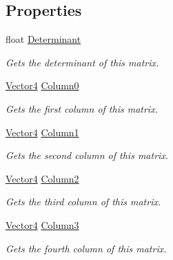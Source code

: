 \subsection*{Properties}
\begin{DoxyCompactItemize}
\item 
float \hyperlink{struct_open_t_k_1_1_matrix4_a2763231a75e342ff722346ac609ac5f7}{Determinant}
\begin{DoxyCompactList}\small\item\em Gets the determinant of this matrix. \end{DoxyCompactList}\item 
\hyperlink{struct_open_t_k_1_1_vector4}{Vector4} \hyperlink{struct_open_t_k_1_1_matrix4_a98cd484a752138482978b3695af0ea97}{Column0}
\begin{DoxyCompactList}\small\item\em Gets the first column of this matrix. \end{DoxyCompactList}\item 
\hyperlink{struct_open_t_k_1_1_vector4}{Vector4} \hyperlink{struct_open_t_k_1_1_matrix4_aa71936442a2e4d016158f6562457f8aa}{Column1}
\begin{DoxyCompactList}\small\item\em Gets the second column of this matrix. \end{DoxyCompactList}\item 
\hyperlink{struct_open_t_k_1_1_vector4}{Vector4} \hyperlink{struct_open_t_k_1_1_matrix4_a8ceb934eacdadb27bc25e1dad87aa19d}{Column2}
\begin{DoxyCompactList}\small\item\em Gets the third column of this matrix. \end{DoxyCompactList}\item 
\hyperlink{struct_open_t_k_1_1_vector4}{Vector4} \hyperlink{struct_open_t_k_1_1_matrix4_af8797da77258a8d900f2bfa09f216136}{Column3}
\begin{DoxyCompactList}\small\item\em Gets the fourth column of this matrix. \end{DoxyCompactList}\item 

\end{DoxyCompactItemize}
